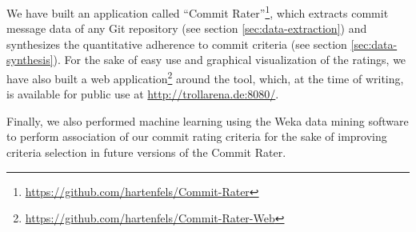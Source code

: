 We have built an application called ``Commit Rater''\footnote{\url{https://github.com/hartenfels/Commit-Rater}}, which extracts commit message data of any Git repository (see section \ref{sec:data-extraction}) and synthesizes the quantitative adherence to commit criteria (see section \ref{sec:data-synthesis}). For the sake of easy use and graphical visualization of the ratings, we have also built a web application\footnote{\url{https://github.com/hartenfels/Commit-Rater-Web}} around the tool, which, at the time of writing, is available for public use at \url{http://trollarena.de:8080/}.

Finally, we also performed machine learning using the Weka data mining software\cite{Weka} to perform association of our commit rating criteria for the sake of improving criteria selection in future versions of the Commit Rater.
